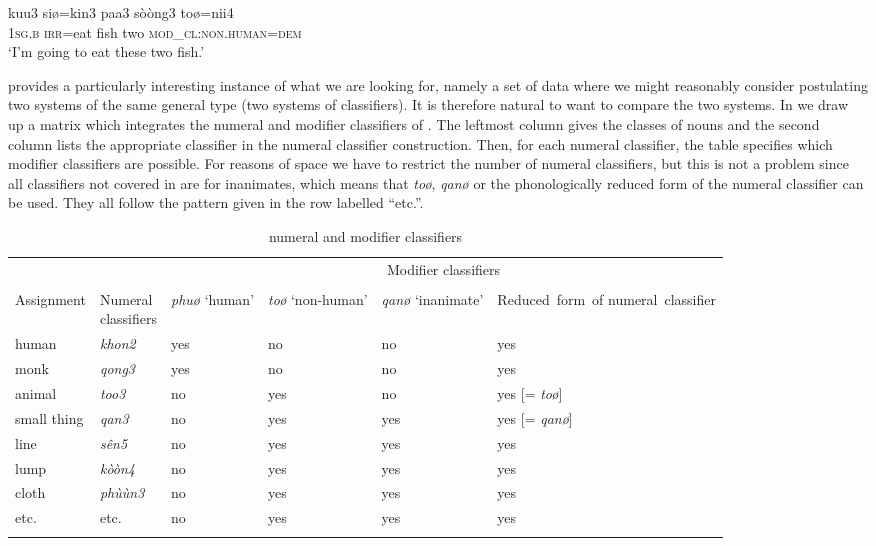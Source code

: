 \documentclass[output=paper]{langsci/langscibook}
\begin{document}
\ea%
    \label{ex:fc:9}

    \gll  kuu3    siø=kin3    paa3  sòòng3  toø=nii4\\
	    \textsc{1sg.b}  \textsc{irr}=eat    fish  two    \textsc{mod\_cl}:\textsc{non.human}=\textsc{dem}\\
    \glt  ‘I’m going to eat these two fish.’
    \z

 provides a particularly interesting instance of what we are looking for, namely a set of data where we might reasonably consider postulating two systems of the same general type (two systems of classifiers). It is therefore natural to want to compare the two systems. In  we draw up a matrix which integrates the numeral and modifier classifiers of . The leftmost column gives the classes of nouns and the second column lists the appropriate classifier in the numeral classifier construction. Then, for each numeral classifier, the table specifies which modifier classifiers are possible. For reasons of space we have to restrict the number of numeral classifiers, but this is not a problem since all classifiers not covered in  are for inanimates, which means that \textit{toø}, \textit{qanø} or the phonologically reduced form of the numeral classifier can be used. They all follow the pattern given in the row labelled “etc.”.
\begin{table}
\begin{tabularx}{\textwidth}{lp{1.5cm}p{1cm}p{1.4cm}p{1.5cm}X}
\lsptoprule 
 &  & \multicolumn{4}{c}{Modifier classifiers}\\
 \hhline{~~----}\\[-.9em]
Assignment& \parbox[t]{1cm}{Numeral\\classifiers}  & \textit{phuø} \mbox{‘human’} & \textit{toø} {‘non-human’} & \textit{qanø} \mbox{‘inanimate’} & \mbox{Reduced form of} \mbox{numeral classifier}\\
\midrule
human & \textit{khon2} & yes & no & no & yes\\
monk & \textit{qong3} & yes & no & no & yes\\
animal & \textit{too3} & no &  yes & no & yes [= \textit{toø}]\\
small thing & \textit{qan3} & no &  yes &  yes & yes [= \textit{qanø}]\\
line & \textit{sên5} & no &  yes &  yes & yes\\
lump & \textit{kòòn4} & no &  yes &  yes & yes\\
cloth & \textit{phùùn3} & no &  yes &  yes & yes\\
etc. & etc. & no &  yes &  yes & yes\\
\lspbottomrule
\end{tabularx}
\caption{ numeral and modifier classifiers}
\label{tab:1}
\end{table}
\end{document}
